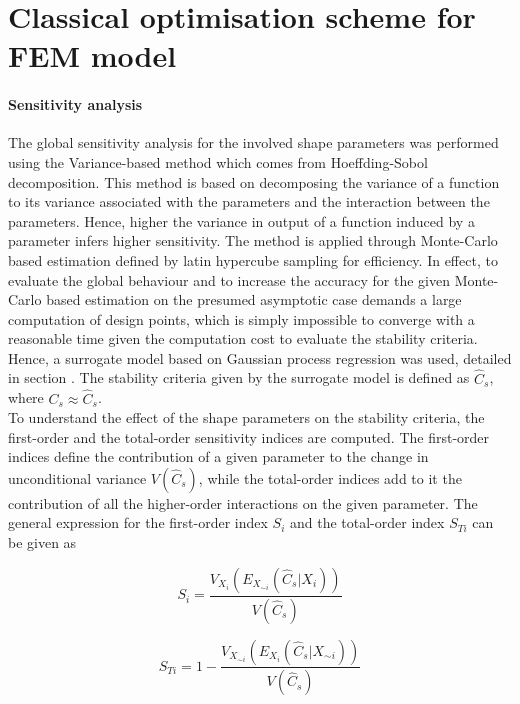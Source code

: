 \chapter{Classical optimisation scheme for FEM model}

 \subsubsection{Sensitivity analysis}
    

  The global sensitivity analysis for the involved shape parameters was performed using the Variance-based method which comes from Hoeffding-Sobol decomposition. This method is based on decomposing the variance of a function to its variance associated with the parameters and the interaction between the parameters. Hence, higher the variance in output of a function induced by a parameter infers higher sensitivity. The method is applied through Monte-Carlo based estimation defined by latin hypercube sampling for efficiency. In effect, to evaluate the global behaviour and to increase the accuracy for the given Monte-Carlo based estimation on the presumed asymptotic case demands a large computation of design points, which is simply impossible to converge with a reasonable time given the computation cost to evaluate the stability criteria. Hence, a surrogate model based on Gaussian process regression was used, detailed in section . The stability criteria given by the surrogate model is defined as $\hat C_s$, where $ C_s \approx \hat C_s$.\\ 

To understand the effect of the shape parameters on the stability criteria, the first-order and the total-order sensitivity indices are computed. The first-order indices define the contribution of a given parameter to the change in unconditional variance $V(\hat C_s)$, while the total-order indices add to it the contribution of all the higher-order interactions on the given parameter. The general expression for the first-order index $S_i$ and the total-order index $S_{Ti}$  can be given as 

\begin{equation}
S_i = \dfrac{V_{X_i}(E_{X_{\sim i}}(\hat C_s|X_i))}{V(\hat C_s)}
\end{equation}

\begin{equation}
S_{Ti} = 1-\dfrac{V_{X_{\sim i}}(E_{X_i}(\hat C_s|X_{\sim i}))}{V(\hat C_s)}
\end{equation}

